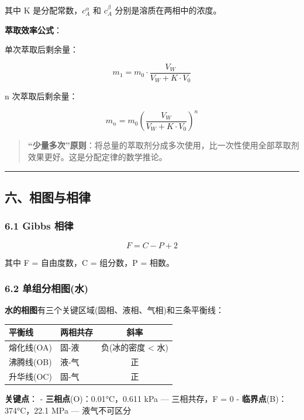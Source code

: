 其中 K 是分配常数，\(c_A^\alpha\) 和 \(c_A^\beta\) 分别是溶质在两相中的浓度。

\textbf{萃取效率公式}：

单次萃取后剩余量：

\[
m_1 = m_0 \cdot \frac{V_W}{V_W + K \cdot V_0}
\]

n 次萃取后剩余量：

\[
m_n = m_0 \left(\frac{V_W}{V_W + K \cdot V_0}\right)^n
\]

\begin{quote}
\textbf{``少量多次''原则}：将总量的萃取剂分成多次使用，比一次性使用全部萃取剂效果更好。这是分配定律的数学推论。
\end{quote}

\begin{center}\rule{0.5\linewidth}{0.5pt}\end{center}

\subsection{六、相图与相律}\label{ux516dux76f8ux56feux4e0eux76f8ux5f8b}

\subsubsection{6.1 Gibbs 相律}\label{gibbs-ux76f8ux5f8b}

\[
\boxed{F = C - P + 2}
\]

其中 F = 自由度数，C = 组分数，P = 相数。

\subsubsection{6.2 单组分相图(水)}\label{ux5355ux7ec4ux5206ux76f8ux56feux6c34}

\textbf{水的相图}有三个关键区域(固相、液相、气相)和三条平衡线：

{\def\LTcaptype{none} %
\begin{longtable}[]{@{}llc@{}}
\toprule\noalign{}
平衡线 & 两相共存 & 斜率 \\
\midrule\noalign{}
\endhead
\bottomrule\noalign{}
\endlastfoot
熔化线(OA) & 固-液 & 负(冰的密度 \textless{} 水) \\
沸腾线(OB) & 液-气 & 正 \\
升华线(OC) & 固-气 & 正 \\
\end{longtable}
}

\textbf{关键点}：
- \textbf{三相点}(O)：0.01°C，0.611 kPa --- 三相共存，F = 0
- \textbf{临界点}(B)：374°C，22.1 MPa --- 液气不可区分

